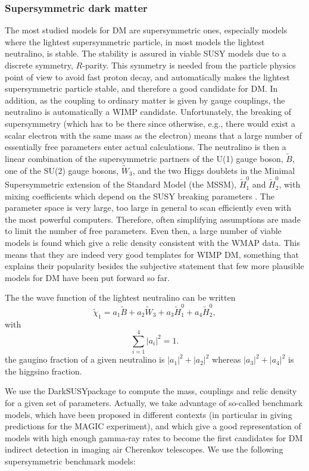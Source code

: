 \documentclass[10pt,aps,pra,reprint,amsmath,amsfonts,amssymb,showpacs,nofootinbib,floatfix]{revtex4-1}
\newcommand{\ds}{{\sc DarkSUSY}}
\begin{document}
\subsubsection{Supersymmetric dark matter}
The most studied models for DM are supersymmetric ones, especially
models where the lightest supersymmetric particle, in most models the
lightest neutralino, is stable. The stability is assured in viable
SUSY models due to a discrete symmetry, $R$-parity. This symmetry is
needed from the particle physics point of view to avoid fast proton
decay, and automatically makes the lightest supersymmetric particle
stable, and therefore a good candidate for DM. In addition, as the
coupling to ordinary matter is given by gauge couplings, the
neutralino is automatically a WIMP candidate. Unfortunately, the
breaking of supersymmetry (which has to be there since otherwise,
e.g., there would exist a scalar electron with the same mass as the
electron) means that a large number of essentially free parameters
enter actual calculations.  The neutralino is then a linear
combination of the supersymmetric partners of the U(1) gauge boson,
$\tilde B$, one of the SU(2) gauge bosons, $\tilde W_3$, and the two
Higgs doublets in the Minimal Supersymmetric extension of the Standard
Model (the MSSM), $\tilde H_1^0$ and $\tilde H_2^0$, with mixing
coefficients which depend on the SUSY breaking parameters
\cite{1984NuPhB.238..453E}. The parameter space is very large, too
large in general to scan efficiently even with the most powerful
computers. Therefore, often simplifying assumptions are made to limit
the number of free parameters. Even then, a large number of viable
models is found which give a relic density consistent with the WMAP
data. This means that they are indeed very good templates for WIMP DM,
something that explains their popularity besides the subjective
statement that few more plausible models for DM have been put forward
so far.

The the wave function of the lightest neutralino can be written
$$
\tilde\chi_1=a_1\tilde B+a_2\tilde W_3+a_3 \tilde H_1^0+a_4\tilde H_2^0,
$$
with 
$$
\sum_{i=1}^4 |a_i|^2=1.
$$
the gaugino fraction of a given neutralino is $|a_1|^2+|a_2|^2$ whereas $|a_3|^2+|a_4|^2$ is the higgsino fraction. 


We use the \ds package \cite{ds} to compute the mass, couplings and
relic density for a given set of parameters.  Actually, we take
advantage of so-called benchmark models, which have been proposed in
different contexts (in particular in \cite{Bringmann:2008kj} giving
predictions for the MAGIC experiment), and which give a good
representation of models with high enough gamma-ray rates to become
the first candidates for DM indirect detection in imaging air
Cherenkov telescopes. We use the following supersymmetric benchmark
models:
\end{document}
